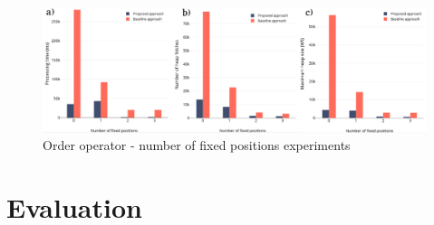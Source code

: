 \begin{figure}[H]
	\includegraphics[scale=0.25]{images/order.png}
	\centering
	\caption{Order operator - number of fixed positions experiments}
	\label{fig:order}
\end{figure}

\section{Evaluation}
\label{sec:eval}

